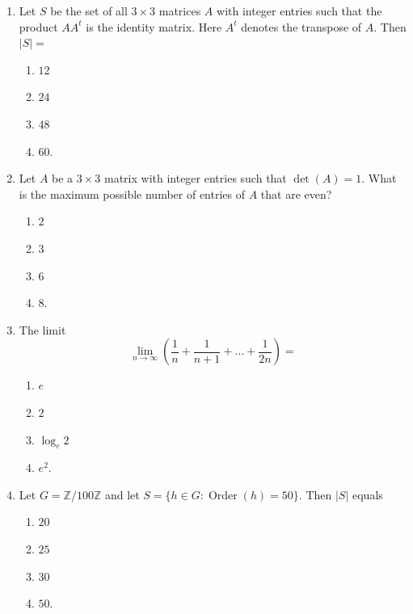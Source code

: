 \documentclass[11pt, a4paper]{article}
\begin{document}
\begin{enumerate}
  \item Let $S$ be the set of all $3 \times 3$ matrices $A$ with integer entries such that the product $AA^t$ is the identity matrix. Here $A^t$ denotes the transpose of $A$. Then $|S| =$
  \begin{enumerate}[label=\Alph*.]
    \item $12$
    \item $24$
    \item $48$
    \item $60$.
  \end{enumerate}

  \item Let $A$ be a $3 \times 3$ matrix with integer entries such that $\det(A) = 1$. What is the maximum possible number of entries of $A$ that are even?
  \begin{enumerate}[label=\Alph*.]
    \item $2$
    \item $3$
    \item $6$
    \item $8$.
  \end{enumerate}

  \item The limit
  \[
    \lim_{n \to \infty} \left(\frac{1}{n} + \frac{1}{n + 1} + \dots + \frac{1}{2n}\right) =
  \]
  \begin{enumerate}[label=\Alph*.]
    \item $e$
    \item $2$
    \item $\log_e 2$
    \item $e^2$.
  \end{enumerate}

  \item Let $G = \mathbb{Z}/100\mathbb{Z}$ and let $S = \{h \in G : \operatorname{Order}(h) = 50\}$. Then $|S|$ equals
  \begin{enumerate}[label=\Alph*.]
    \item $20$
    \item $25$
    \item $30$
    \item $50$.
  \end{enumerate}
\end{enumerate}
\end{document}
